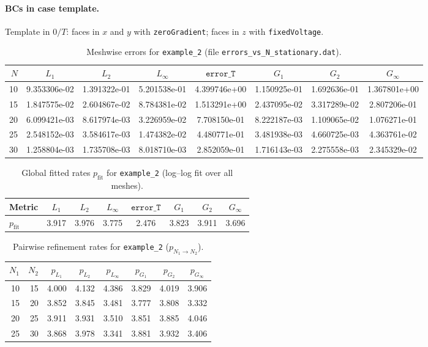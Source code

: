 \documentclass[11pt,a4paper]{article}
\begin{document}
\paragraph{BCs in case template.}
Template in $0/T$: faces in $x$ and $y$ with \texttt{zeroGradient}; faces in $z$ with \texttt{fixedVoltage}.
\begin{table}[htbp]
\centering
\caption{Meshwise errors for \texttt{example\_2} (file \texttt{errors\_vs\_N\_stationary.dat}).}
\label{tab:errors-example-2}
\scriptsize
\begin{tabular}{rccccccc}
\toprule
$N$ & $L_1$ & $L_2$ & $L_\infty$ & $\texttt{error\_T}$ & $G_1$ & $G_2$ & $G_\infty$ \\
\midrule
10 & 9.353306e-02 & 1.391322e-01 & 5.201538e-01 & 4.399746e+00 & 1.150925e-01 & 1.692636e-01 & 1.367801e+00 \\
15 & 1.847575e-02 & 2.604867e-02 & 8.784381e-02 & 1.513291e+00 & 2.437095e-02 & 3.317289e-02 & 2.807206e-01 \\
20 & 6.099421e-03 & 8.617974e-03 & 3.226959e-02 & 7.708150e-01 & 8.222187e-03 & 1.109065e-02 & 1.076271e-01 \\
25 & 2.548152e-03 & 3.584617e-03 & 1.474382e-02 & 4.480771e-01 & 3.481938e-03 & 4.660725e-03 & 4.363761e-02 \\
30 & 1.258804e-03 & 1.735708e-03 & 8.018710e-03 & 2.852059e-01 & 1.716143e-03 & 2.275558e-03 & 2.345329e-02 \\
\bottomrule
\end{tabular}
\end{table}
\begin{table}[htbp]
\centering
\caption{Global fitted rates $p_{\mathrm{fit}}$ for \texttt{example\_2} (log--log fit over all meshes).}
\label{tab:fit-example-2}
\small
\begin{tabular}{lccccccc}
\toprule
Metric & $L_1$ & $L_2$ & $L_\infty$ & $\texttt{error\_T}$ & $G_1$ & $G_2$ & $G_\infty$ \\
\midrule
$p_{\mathrm{fit}}$ & 3.917 & 3.976 & 3.775 & 2.476 & 3.823 & 3.911 & 3.696 \\
\bottomrule
\end{tabular}
\end{table}
\begin{table}[htbp]
\centering
\caption{Pairwise refinement rates for \texttt{example\_2} ($p_{N_1\to N_2}$).}
\label{tab:pair-example-2}
\scriptsize
\begin{tabular}{rrcccccc}
\toprule
$N_1$ & $N_2$ & $p_{L_1}$ & $p_{L_2}$ & $p_{L_\infty}$ & $p_{G_1}$ & $p_{G_2}$ & $p_{G_\infty}$ \\
\midrule
10 & 15 & 4.000 & 4.132 & 4.386 & 3.829 & 4.019 & 3.906 \\
15 & 20 & 3.852 & 3.845 & 3.481 & 3.777 & 3.808 & 3.332 \\
20 & 25 & 3.911 & 3.931 & 3.510 & 3.851 & 3.885 & 4.046 \\
25 & 30 & 3.868 & 3.978 & 3.341 & 3.881 & 3.932 & 3.406 \\
\bottomrule
\end{tabular}
\end{table}
\end{document}
